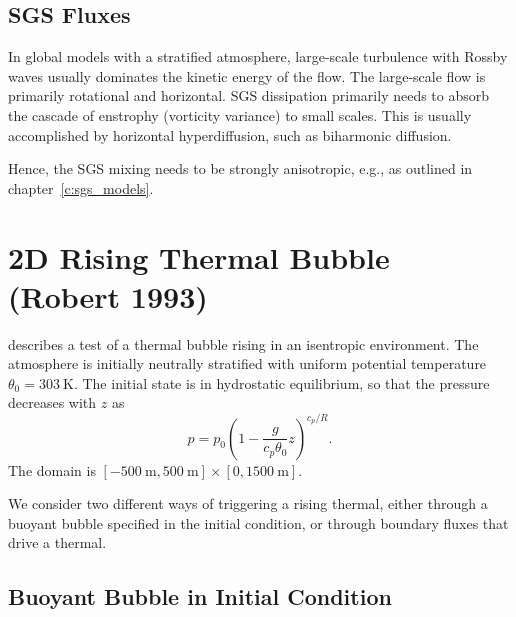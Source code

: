 \documentclass{report}
\begin{document}
\subsection{SGS Fluxes}
In global models with a stratified atmosphere, large-scale turbulence with Rossby waves usually dominates the kinetic energy of the flow. The large-scale flow is primarily rotational and horizontal. SGS dissipation primarily needs to absorb the cascade of enstrophy (vorticity variance) to small scales. This is usually accomplished by horizontal hyperdiffusion, such as biharmonic diffusion.

Hence, the SGS mixing needs to be strongly anisotropic, e.g., as outlined in chapter~\ref{c:sgs_models}.

\section{2D Rising Thermal Bubble (Robert 1993)}
\label{2dRTBtest}
\cite{robert1993} describes a test of a thermal bubble rising in an isentropic environment. The atmosphere is initially neutrally stratified with uniform potential temperature $\theta_0 = 303~\mathrm{K}$. The initial state is in hydrostatic equilibrium, so that the pressure decreases with $z$ as
\begin{equation}
\label{pressureDistrib}
p = p_{0}\left(1-\frac{g}{c_p{\theta_{0}}}z\right)^{c_p/R}.
\end{equation}
The domain is $[-500~\mathrm{m},500~\mathrm{m}]\times[0,1500~\mathrm{m}]$. 

We consider two different ways of triggering a rising thermal, either through a buoyant bubble specified in the initial condition, or through boundary fluxes that drive a thermal.

\subsection{Buoyant Bubble in Initial Condition}
\end{document}
